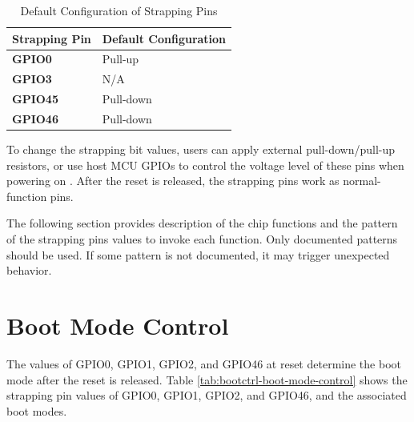 \documentclass[main\_\_EN.tex]{subfiles}
\begin{document}
\begin{longtable}[c]{|p{2.5cm}|p{3.5cm}|}
\caption{Default Configuration of Strapping Pins}
\label{tab:bootctrl-default-config-strapping-pins} \\
    \hline
    \rowcolor{lightgray}
  \textbf{Strapping Pin} & \textbf{Default Configuration} \\ \hline
  \textbf{GPIO0} & Pull-up \\ \hline
  \textbf{GPIO3} & N/A \\ \hline
  \textbf{GPIO45} & Pull-down \\ \hline
  \textbf{GPIO46} & Pull-down \\ \hline
\end{longtable}

To change the strapping bit values, users can apply external pull-down/pull-up resistors, or use host MCU GPIOs to control the voltage level of these pins when powering on \chipname{}. After the reset is released, the strapping pins work as normal-function pins.

\begin{tiplisting}
The following section provides description of the chip functions and the pattern of the strapping pins values to invoke each function. Only documented patterns should be used. If some pattern is not documented, it may trigger unexpected behavior.
\end{tiplisting}

\section{Boot Mode Control}\label{sec:bootModeControl}

The values of GPIO0, GPIO1, GPIO2, and GPIO46 at reset determine the boot mode after the reset is released. Table \ref{tab:bootctrl-boot-mode-control} shows the strapping pin values of GPIO0, GPIO1, GPIO2, and GPIO46, and the associated boot modes.
\end{document}
